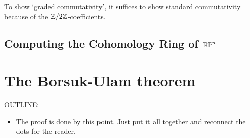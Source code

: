 \documentclass{amsart}
\begin{document}
 To show
`graded commutativity', it suffices to show standard
commutativity because of the $ \mathbb{Z}/2\mathbb{Z} $-coefficients.  




\subsection{Computing the Cohomology Ring of $\mathbb{RP}^n$}




\section{The Borsuk-Ulam theorem}
\label{sec:borsuk-ulam}

OUTLINE:
\begin{itemize}
\item
  The proof is done by this point. Just put it all
  together and reconnect the dots for the reader.
\end{itemize}



\nocite{shul:bfp,brunerie:thesis,br:rp-hott}

\end{document}
